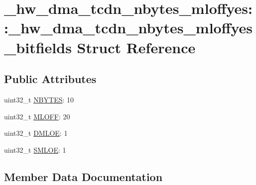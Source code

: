 \hypertarget{struct__hw__dma__tcdn__nbytes__mloffyes_1_1__hw__dma__tcdn__nbytes__mloffyes__bitfields}{}\section{\+\_\+hw\+\_\+dma\+\_\+tcdn\+\_\+nbytes\+\_\+mloffyes\+:\+:\+\_\+hw\+\_\+dma\+\_\+tcdn\+\_\+nbytes\+\_\+mloffyes\+\_\+bitfields Struct Reference}
\label{struct__hw__dma__tcdn__nbytes__mloffyes_1_1__hw__dma__tcdn__nbytes__mloffyes__bitfields}
\subsection*{Public Attributes}
\begin{DoxyCompactItemize}
\item 
uint32\+\_\+t \hyperlink{struct__hw__dma__tcdn__nbytes__mloffyes_1_1__hw__dma__tcdn__nbytes__mloffyes__bitfields_ae4a82e0fa61ff34351c777f7101eef08}{N\+B\+Y\+T\+ES}\+: 10
\item 
uint32\+\_\+t \hyperlink{struct__hw__dma__tcdn__nbytes__mloffyes_1_1__hw__dma__tcdn__nbytes__mloffyes__bitfields_ae664d96b21da3dee3a1087272b7e7848}{M\+L\+O\+FF}\+: 20
\item 
uint32\+\_\+t \hyperlink{struct__hw__dma__tcdn__nbytes__mloffyes_1_1__hw__dma__tcdn__nbytes__mloffyes__bitfields_a9b9602ca3ef9fb588a1649b7116121a1}{D\+M\+L\+OE}\+: 1
\item 
uint32\+\_\+t \hyperlink{struct__hw__dma__tcdn__nbytes__mloffyes_1_1__hw__dma__tcdn__nbytes__mloffyes__bitfields_ac67156243ac9546bb43fe3a1bc6ac492}{S\+M\+L\+OE}\+: 1
\end{DoxyCompactItemize}


\subsection{Member Data Documentation}
